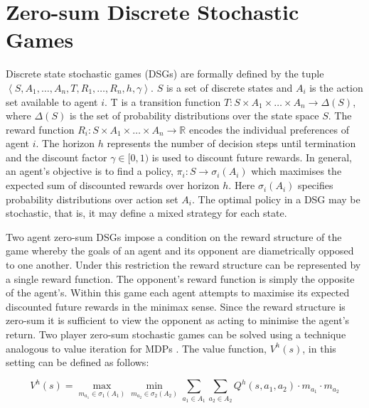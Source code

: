 \section{Zero-sum Discrete Stochastic Games}
\label{sec:dsg}
Discrete state stochastic games (DSGs) are formally defined by the tuple
$ \left\langle S, A_{1}, \ldots, A_{n}, T, R_{1}, \ldots, R_{n}, h, \gamma\right\rangle$.
$S$ is a set of discrete states and $A_i$ is the action set available to agent 
$i$. T is a transition function $T : S \times A_1 \times \ldots \times A_n \rightarrow \Delta(S)$, 
where $\Delta(S)$ is the set of probability distributions over the state space $S$. 
The reward function $R_i : S \times A_1 \times \ldots \times A_n \rightarrow \mathbb{R}$ 
encodes the individual preferences of agent $i$. The horizon $h$ represents the 
number of decision steps until termination and the discount factor $\gamma \in [0, 1)$ 
is used to discount future rewards. In general, an agent's objective is 
to find a policy, $\pi_i : S \rightarrow \sigma_i(A_i)$ which maximises the expected 
sum of discounted rewards over horizon $h$. Here $\sigma_i(A_i)$ specifies
probability distributions over action set $A_i$. The optimal policy in a 
DSG may be stochastic, that is, it may define a mixed strategy for each state. 


Two agent zero-sum DSGs impose a condition on the reward structure 
of the game whereby the goals of an agent and its opponent are diametrically
opposed to one another. Under this restriction the reward structure can 
be represented by a single reward function. The opponent's
reward function is simply the opposite of the agent's. Within this game 
each agent attempts to maximise its expected discounted future rewards 
in the minimax sense. Since the reward structure is zero-sum it is sufficient to view the 
opponent as acting to minimise the agent's return. Two player zero-sum 
stochastic games can be solved using a technique analogous to value 
iteration for MDPs \cite{Littman_ICML_1994}. The value function, $V^{h}(s)$,
in this setting can be defined as follows:

{\footnotesize 
\begin{equation}
\label{eq:dsgvfunc}
  V^{h}(s) = \max_{m_{a_{1}} \in \sigma_1(A_1)}\min_{m_{a_{2}} \in \sigma_2(A_2)} \sum_{a_1 \in A_1} \sum_{a_2 \in A_2} Q^{h}(s, a_1, a_2) \cdot m_{a_{1}} \cdot m_{a_{2}}
\end{equation}
}%

